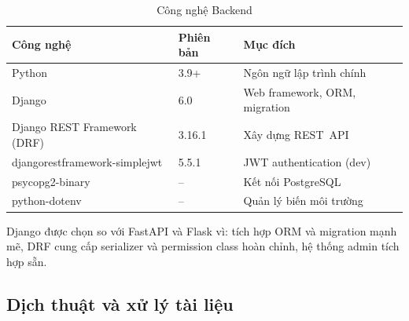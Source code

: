 \begin{table}[H]
\centering
\caption{Công nghệ Backend}
\label{tab:tech_be}
\renewcommand{\arraystretch}{1.3}
\begin{tabularx}{\textwidth}{|l|l|X|}
\hline
\textbf{Công nghệ}           & \textbf{Phiên bản} & \textbf{Mục đích} \\
\hline
Python                       & 3.9+              & Ngôn ngữ lập trình chính \\
\hline
Django                       & 6.0               & Web framework, ORM, migration \\
\hline
Django REST Framework (DRF)  & 3.16.1            & Xây dựng REST~API \\
\hline
djangorestframework-simplejwt & 5.5.1            & JWT authentication (dev) \\
\hline
psycopg2-binary              & --                & Kết nối PostgreSQL \\
\hline
python-dotenv                & --                & Quản lý biến môi trường \\
\hline
\end{tabularx}
\end{table}

Django được chọn so với FastAPI và Flask vì: tích hợp ORM và migration mạnh mẽ, DRF cung cấp
serializer và permission class hoàn chỉnh, hệ thống admin tích hợp sẵn.

\subsection{Dịch thuật và xử lý tài liệu}


